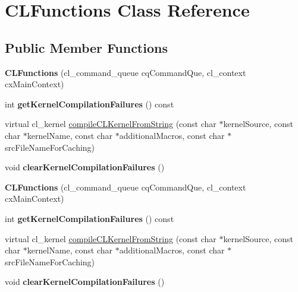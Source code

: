 \hypertarget{classCLFunctions}{}\section{C\+L\+Functions Class Reference}
\label{classCLFunctions}
\subsection*{Public Member Functions}
\begin{DoxyCompactItemize}
\item 
\mbox{\label{classCLFunctions_a1aba8fcfae73b1cf3992be273c649cb1}} 
{\bfseries C\+L\+Functions} (cl\+\_\+command\+\_\+queue cq\+Command\+Que, cl\+\_\+context cx\+Main\+Context)
\item 
\mbox{\label{classCLFunctions_af7167d3be69acf530c28dc56fdf34220}} 
int {\bfseries get\+Kernel\+Compilation\+Failures} () const
\item 
virtual cl\+\_\+kernel \hyperlink{classCLFunctions_a87f7cc3be08f51966e0bc087e7520a9f}{compile\+C\+L\+Kernel\+From\+String} (const char $\ast$kernel\+Source, const char $\ast$kernel\+Name, const char $\ast$additional\+Macros, const char $\ast$src\+File\+Name\+For\+Caching)
\item 
\mbox{\label{classCLFunctions_ae500f8c768182c5a432f4c506917eaad}} 
void {\bfseries clear\+Kernel\+Compilation\+Failures} ()
\item 
\mbox{\label{classCLFunctions_a1aba8fcfae73b1cf3992be273c649cb1}} 
{\bfseries C\+L\+Functions} (cl\+\_\+command\+\_\+queue cq\+Command\+Que, cl\+\_\+context cx\+Main\+Context)
\item 
\mbox{\label{classCLFunctions_af7167d3be69acf530c28dc56fdf34220}} 
int {\bfseries get\+Kernel\+Compilation\+Failures} () const
\item 
virtual cl\+\_\+kernel \hyperlink{classCLFunctions_a0cdf897c3d96b4c029c663fc64cd7ffb}{compile\+C\+L\+Kernel\+From\+String} (const char $\ast$kernel\+Source, const char $\ast$kernel\+Name, const char $\ast$additional\+Macros, const char $\ast$src\+File\+Name\+For\+Caching)
\item 
\mbox{\label{classCLFunctions_ae500f8c768182c5a432f4c506917eaad}} 
void {\bfseries clear\+Kernel\+Compilation\+Failures} ()
\end{DoxyCompactItemize}

